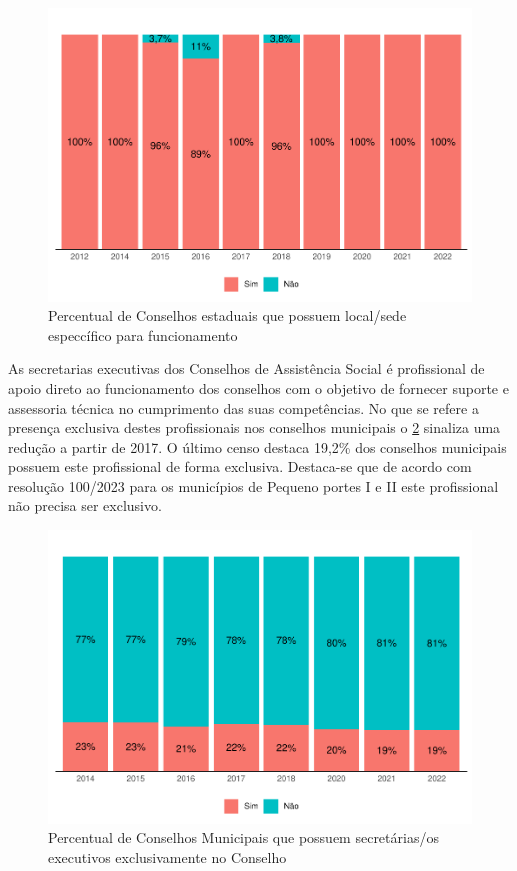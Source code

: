 \documentclass[
  brazilian]{report}
\begin{document}
\begin{figure}
\includegraphics{Censo-SUAS-2022_files/figure-latex/ceas_sede-1} \caption[Percentual de Conselhos estaduais que possuem local/sede especcífico para funcionamento]{Percentual de Conselhos estaduais que possuem local/sede especcífico para funcionamento}\label{fig:ceas_sede}
\end{figure}

As secretarias executivas dos Conselhos de Assistência Social é
profissional de apoio direto ao funcionamento dos conselhos com o
objetivo de fornecer suporte e assessoria técnica no cumprimento das
suas competências. No que se refere a presença exclusiva destes
profissionais nos conselhos municipais o \cref{fig:cmas_se} sinaliza uma
redução a partir de 2017. O último censo destaca 19,2\% dos conselhos
municipais possuem este profissional de forma exclusiva. Destaca-se que
de acordo com resolução 100/2023 para os municípios de Pequeno portes I
e II este profissional não precisa ser exclusivo.

\begin{figure}
\includegraphics{Censo-SUAS-2022_files/figure-latex/cmas_se-1} \caption[Percentual de Conselhos Municipais que possuem secretárias/os executivos exclusivamente no Conselho]{Percentual de Conselhos Municipais que possuem secretárias/os executivos exclusivamente no Conselho}\label{fig:cmas_se}
\end{figure}
\end{document}
